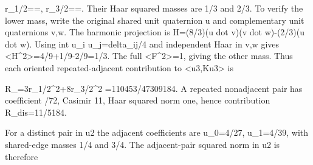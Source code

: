 \documentclass[11pt,a4paper]{article}
\renewcommand{\[}{\begingroup\small\originaldisplaystart}
\renewcommand{\]}{\originaldisplayend\endgroup}
\begin{document}
\[
 r_{1/2}==,
 \qquad
 r_{3/2}==.
\] Their Haar squared masses are 1/3 and 2/3. To verify the lower mass,
write the original shared unit quaternion u and complementary unit
quaternions v,w. The harmonic projection is
{\ttfamily H\allowbreak{}=\allowbreak{}(\allowbreak{}8\allowbreak{}/\allowbreak{}3\allowbreak{})\allowbreak{}(\allowbreak{}u\allowbreak{} \allowbreak{}d\allowbreak{}o\allowbreak{}t\allowbreak{} \allowbreak{}v\allowbreak{})\allowbreak{}(\allowbreak{}v\allowbreak{} \allowbreak{}d\allowbreak{}o\allowbreak{}t\allowbreak{} \allowbreak{}w\allowbreak{})\allowbreak{}-\allowbreak{}(\allowbreak{}2\allowbreak{}/\allowbreak{}3\allowbreak{})\allowbreak{}(\allowbreak{}u\allowbreak{} \allowbreak{}d\allowbreak{}o\allowbreak{}t\allowbreak{} \allowbreak{}w\allowbreak{})\allowbreak{}}.
Using
{\ttfamily i\allowbreak{}n\allowbreak{}t\allowbreak{} \allowbreak{}u\allowbreak{}\_\allowbreak{}i\allowbreak{} \allowbreak{}u\allowbreak{}\_\allowbreak{}j\allowbreak{}=\allowbreak{}d\allowbreak{}e\allowbreak{}l\allowbreak{}t\allowbreak{}a\allowbreak{}\_\allowbreak{}i\allowbreak{}j\allowbreak{}/\allowbreak{}4\allowbreak{}}
and independent Haar in v,w gives
{\ttfamily \textless{}\allowbreak{}H\allowbreak{}\textasciicircum{}\allowbreak{}2\allowbreak{}\textgreater{}\allowbreak{}=\allowbreak{}4\allowbreak{}/\allowbreak{}9\allowbreak{}+\allowbreak{}1\allowbreak{}/\allowbreak{}9\allowbreak{}-\allowbreak{}2\allowbreak{}/\allowbreak{}9\allowbreak{}=\allowbreak{}1\allowbreak{}/\allowbreak{}3\allowbreak{}}.
The full
{\ttfamily \textless{}\allowbreak{}F\allowbreak{}\textasciicircum{}\allowbreak{}2\allowbreak{}\textgreater{}\allowbreak{}=\allowbreak{}1\allowbreak{}},
giving the other mass. Thus each oriented repeated-adjacent contribution
to
{\ttfamily \textless{}\allowbreak{}u\allowbreak{}3\allowbreak{},\allowbreak{}K\allowbreak{}u\allowbreak{}3\allowbreak{}\textgreater{}\allowbreak{}}
is

\[
 R_{}=3r_{1/2}^{2}+8r_{3/2}^{2}
                 =110453/47309184.
\] A repeated nonadjacent pair has coefficient
{\allowbreak{}/\allowbreak{}7\allowbreak{}2\allowbreak{}},
Casimir 11, Haar squared norm one, hence contribution
{\ttfamily R\allowbreak{}\_\allowbreak{}d\allowbreak{}i\allowbreak{}s\allowbreak{}=\allowbreak{}1\allowbreak{}1\allowbreak{}/\allowbreak{}5\allowbreak{}1\allowbreak{}8\allowbreak{}4\allowbreak{}}.

For a distinct pair in u2 the adjacent coefficients are
{\ttfamily u\allowbreak{}\_\allowbreak{}0\allowbreak{}=\allowbreak{}4\allowbreak{}/\allowbreak{}2\allowbreak{}7\allowbreak{}},
{\ttfamily u\allowbreak{}\_\allowbreak{}1\allowbreak{}=\allowbreak{}4\allowbreak{}/\allowbreak{}3\allowbreak{}9\allowbreak{}},
with shared-edge masses 1/4 and 3/4. The adjacent-pair squared norm in
u2 is therefore
\end{document}
